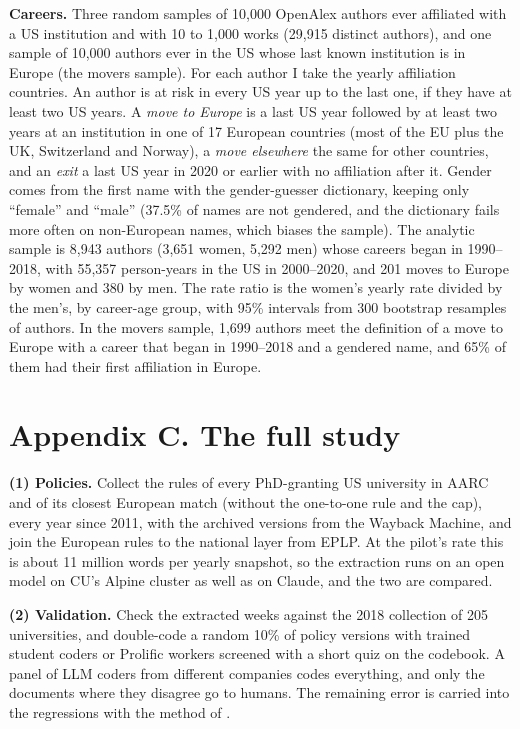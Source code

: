\documentclass[10pt,twocolumn]{article}
\begin{document}
\textbf{Careers.} Three random samples of 10,000 OpenAlex authors ever affiliated with a US institution and with 10 to 1,000 works (29,915 distinct authors), and one sample of 10,000 authors ever in the US whose last known institution is in Europe (the movers sample). For each author I take the yearly affiliation countries. An author is at risk in every US year up to the last one, if they have at least two US years. A \emph{move to Europe} is a last US year followed by at least two years at an institution in one of 17 European countries (most of the EU plus the UK, Switzerland and Norway), a \emph{move elsewhere} the same for other countries, and an \emph{exit} a last US year in 2020 or earlier with no affiliation after it. Gender comes from the first name with the gender-guesser dictionary, keeping only ``female'' and ``male'' (37.5\% of names are not gendered, and the dictionary fails more often on non-European names, which biases the sample). The analytic sample is 8,943 authors (3,651 women, 5,292 men) whose careers began in 1990--2018, with 55,357 person-years in the US in 2000--2020, and 201 moves to Europe by women and 380 by men. The rate ratio is the women's yearly rate divided by the men's, by career-age group, with 95\% intervals from 300 bootstrap resamples of authors. In the movers sample, 1,699 authors meet the definition of a move to Europe with a career that began in 1990--2018 and a gendered name, and 65\% of them had their first affiliation in Europe.

\section*{Appendix C. The full study}
\textbf{(1) Policies.} Collect the rules of every PhD-granting US university in AARC and of its closest European match (without the one-to-one rule and the cap), every year since 2011, with the archived versions from the Wayback Machine, and join the European rules to the national layer from EPLP. At the pilot's rate this is about 11 million words per yearly snapshot, so the extraction runs on an open model on CU's Alpine cluster as well as on Claude, and the two are compared.

\textbf{(2) Validation.} Check the extracted weeks against the 2018 collection of 205 universities, and double-code a random 10\% of policy versions with trained student coders or Prolific workers screened with a short quiz on the codebook. A panel of LLM coders from different companies codes everything, and only the documents where they disagree go to humans. The remaining error is carried into the regressions with the method of \citet{gligoric2025}.
\end{document}
